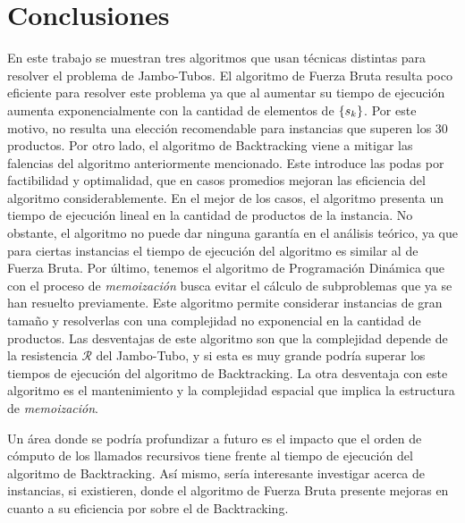 \documentclass{article}
\DeclarePairedDelimiter\curl{\{}{\}}
\newcommand{\fb}{Fuerza Bruta}
\newcommand{\pd}{Programación Dinámica}
\newcommand{\bt}{Backtracking}
\newcommand{\Res}{\mathcal{R}}
\begin{document}
\section{Conclusiones} \label{sec:conclusiones}
En este trabajo se muestran tres algoritmos que usan técnicas distintas para resolver el problema de Jambo-Tubos. El algoritmo de Fuerza Bruta resulta poco eficiente para resolver este problema ya que al aumentar su tiempo de ejecución aumenta exponencialmente con la cantidad de elementos de $\curl{s_{k}}$. Por este motivo, no resulta una elección recomendable para instancias que superen los 30 productos. Por otro lado, el algoritmo de Backtracking viene a mitigar las falencias del algoritmo anteriormente mencionado. Este introduce las podas por factibilidad y optimalidad, que en casos promedios mejoran las eficiencia del algoritmo considerablemente. En el mejor de los casos, el algoritmo presenta un tiempo de ejecución lineal en la cantidad de productos de la instancia. No obstante, el algoritmo no puede dar ninguna garantía en el análisis teórico, ya que para ciertas instancias el tiempo de ejecución del algoritmo es similar al de \fb{}. Por último, tenemos el algoritmo de \pd{} que con el proceso de \emph{memoización} busca evitar el cálculo de subproblemas que ya se han resuelto previamente. Este algoritmo permite considerar instancias de gran tamaño y resolverlas con una complejidad no exponencial en la cantidad de productos. Las desventajas de este algoritmo son que la complejidad depende de la resistencia $\Res$ del Jambo-Tubo, y si esta es muy grande podría superar los tiempos de ejecución del algoritmo de \bt{}. La otra desventaja con este algoritmo es el mantenimiento y la complejidad espacial que implica la estructura de \emph{memoización}.

Un área donde se podría profundizar a futuro es el impacto que el orden de cómputo de los llamados recursivos tiene frente al tiempo de ejecución del algoritmo de \bt{}. Así mismo, sería interesante investigar acerca de instancias, si existieren, donde el algoritmo de \fb{} presente mejoras en cuanto a su eficiencia por sobre el de \bt{}.
\end{document}
